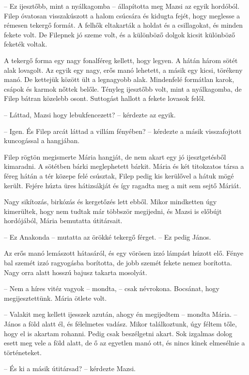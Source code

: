 \documentclass[10pt]{memoir}
\begin{document}
-- Ez ijesztőbb, mint a nyálkagomba -- állapította meg Mazsi az egyik
hordóból.  Filep óvatosan visszakúszott a halom csúcsára és kidugta fejét, hogy
meglesse a rémesen tekergő formát. A felhők eltakarták a holdat és a
csillagokat, és minden fekete volt. De Filepnek jó szeme volt, és a különböző
dolgok kicsit különböző feketék voltak.

A tekergő forma egy nagy fonalféreg kellett, hogy legyen. A hátán három sötét
alak lovagolt. Az egyik egy nagy, erős manó lehetett, a másik egy kicsi,
törékeny manó. De kettejük között ült a legnagyobb alak. Mindenfelé formátlan
karok, csápok és karmok nőttek belőle. Tényleg ijesztőbb volt, mint a
nyálkagomba, de Filep bátran közelebb osont. Suttogást hallott a fekete lovasok
felől.

-- Láttad, Mazsi hogy lebukfencezett? -- kérdezte az egyik.

-- Igen. És Filep arcát láttad a villám fényében? -- kérdezte a másik
visszafojtott kuncogással a hangjában.

Filep rögtön megismerte Mária hangját, de nem akart egy jó ijesztgetésből
kimaradni. A sötétben bárki meglephetett bárkit. Mária és két titokzatos társa
a féreg hátán a tér közepe felé csúsztak, Filep pedig kis kerülővel a hátuk
mögé került. Fejére húzta üres hátizsákját és így ragadta meg a mit sem sejtő
Máriát.

Nagy sikítozás, birkózás és kergetőzés lett ebből. Mikor mindketten úgy
kimerültek, hogy nem tudtak már többször megijedni, és Mazsi is előbújt
hordójából, Mária bemutatta útitársait.

-- Ez Anakonda -- mutatta az örökké tekergő férget. -- Ez pedig János.

Az erős manó lemászott hátasáról, és egy vörösen izzó lámpást húzott elő. Fénye
bal szemét izzó ragyogásba borította, de jobb szemét fekete nemez borította.
Nagy orra alatt hosszú bajusz takarta mosolyát.

-- Nem a híres vitéz vagyok -- mondta, -- csak névrokona. Bocsánat, hogy
megijesztettünk. Mária ötlete volt.

-- Valakit meg kellett ijesszek azután, ahogy én megijedtem -- mondta Mária.
-- János a föld alatt él, és félelmetes vadász. Mikor találkoztunk, úgy féltem
tőle, hogy el is akartam rohanni. Pedig csak beszélgetni akart. Sok izgalmas
dolog esett meg vele a föld alatt, de ő az egyetlen manó ott, és nincs kinek
elmesélnie a történeteket.

-- És ki a másik útitársad? -- kérdezte Mazsi.
\end{document}
